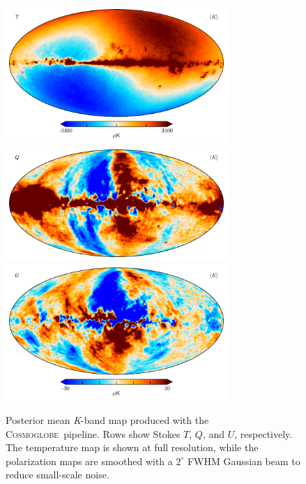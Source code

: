 \documentclass[twocolumn]{../../common/aa}
\newcommand{\cosmoglobe}{\textsc{Cosmoglobe}}
\newcommand{\K}[0]{\textit K}
\begin{document}
\begin{figure}
	\centering
	\includegraphics[width=0.75\textwidth]{figures/023-WMAP_K_mu_I.pdf}
	\includegraphics[width=0.75\textwidth]{figures/023-WMAP_K_mu_Q.pdf}
	\includegraphics[width=0.75\textwidth]{figures/023-WMAP_K_mu_U.pdf}
	\caption{Posterior mean \K-band map produced with the \cosmoglobe\ pipeline. Rows show Stokes $T$, $Q$, and $U$, respectively. The temperature map is shown at full resolution, while the polarization maps are smoothed with a $2^{\circ}$ FWHM Gaussian beam to reduce small-scale noise.}
	\label{fig:kband}
\end{figure}
\end{document}
